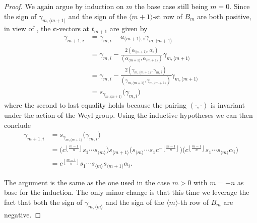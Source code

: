 \documentclass[12pt]{amsart}
\newcommand{\bfc}{\mathbf{c}}
\renewcommand{\mod}[1]{\langle {#1} \rangle}
\numberwithin{equation}{section}
\begin{document}
\begin{proof}
  We again argue by induction on $m$ the base case still being $m=0$. 
  Since the sign of $\gamma_{m,\mod{m+1}}$ and the sign of the $\mod{m+1}$-st row of $B_m$ are both positive, in view of \cite[Proposition 1.3]{NZ12}, the $\bfc$-vectors at $t_{m+1}$ are given by
  \begin{align*}
    \gamma_{m+1,i} 
    &= 
    \gamma_{m,i} - a_{\mod{m+1},i} \gamma_{m,\mod{m+1}}\\
    &=
    \gamma_{m,i} - \frac{2(\alpha_{\mod{m+1}},\alpha_i)}{(\alpha_{\mod{m+1}},\alpha_{\mod{m+1}})} \gamma_{m,\mod{m+1}}\\
    &=
    \gamma_{m,i} - \frac{2(\gamma_{m,\mod{m+1}},\gamma_{m,i})}{(\gamma_{m,\mod{m+1}},\gamma_{m,\mod{m+1}})} \gamma_{m,\mod{m+1}}\\
    &=
    s_{\gamma_{m,\mod{m+1}}}\big(\gamma_{m,i}\big)
  \end{align*}
  where the second to last equality holds because the pairing $(\cdot,\cdot)$ is invariant under the action of the Weyl group.  
  Using the inductive hypotheses we can then conclude
  \begin{align*}
    \gamma_{m+1,i} 
    &=
    s_{\gamma_{m,\mod{m+1}}}\big(\gamma_{m,i}\big)\\
    &=
    \big(c^{\left\lfloor\frac{m-1}{n}\right\rfloor}s_1\cdots s_{\mod{m}}\big)s_{\mod{m+1}}\big(s_{\mod{m}}\cdots s_1 c^{-\left\lfloor\frac{m-1}{n}\right\rfloor}\big)\big(c^{\left\lfloor\frac{m-1}{n}\right\rfloor}s_1\cdots s_{\mod{m}}\alpha_i\big)\\
    &= 
    c^{\left\lfloor\frac{m-1}{n}\right\rfloor}s_1\cdots s_{\mod{m}}s_{\mod{m+1}} \alpha_i.
  \end{align*}

  The argument is the same as the one used in the case $m>0$ with $m=-n$ as base for the induction. 
  The only minor change is that this time we leverage the fact that both the sign of $\gamma_{m,\mod{m}}$ and the sign of the $\mod{m}$-th row of $B_m$ are negative.
\end{proof}
\end{document}
